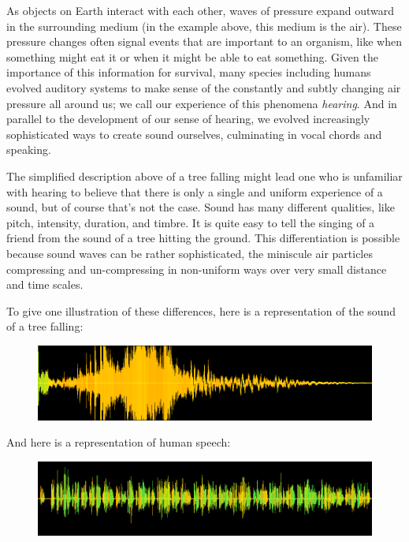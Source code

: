 \documentclass[UTF8]{book}
\begin{document}
\begin{CJK}{UTF8}{gbsn}
As objects on Earth interact with each other, waves of pressure expand outward in the surrounding medium (in the example above, this medium is the air). These pressure changes often signal events that are important to an organism, like when something might eat it or when it might be able to eat something. Given the importance of this information for survival, many species including humans evolved auditory systems to make sense of the constantly and subtly changing air pressure all around us; we call our experience of this phenomena \emph{hearing}. And in parallel to the development of our sense of hearing, we evolved increasingly sophisticated ways to create sound ourselves, culminating in vocal chords and speaking.

The simplified description above of a tree falling might lead one who is unfamiliar with hearing to believe that there is only a single and uniform experience of a sound, but of course that's not the case. Sound has many different qualities, like pitch, intensity, duration, and timbre. It is quite easy to tell the singing of a friend from the sound of a tree hitting the ground. This differentiation is possible because sound waves can be rather sophisticated, the miniscule air particles compressing and un-compressing in non-uniform ways over very small distance and time scales.

To give one illustration of these differences, here is a representation of the sound of a tree falling:

\begin{figure}[H]
\centering
\includegraphics[width=0.8\linewidth]{tree_falling_soundwave}
\end{figure}

And here is a representation of human speech:

\begin{figure}[H]
\centering
\includegraphics[width=0.8\linewidth]{shakespeare_speech}
\end{figure}


\end{CJK}
\end{document}

